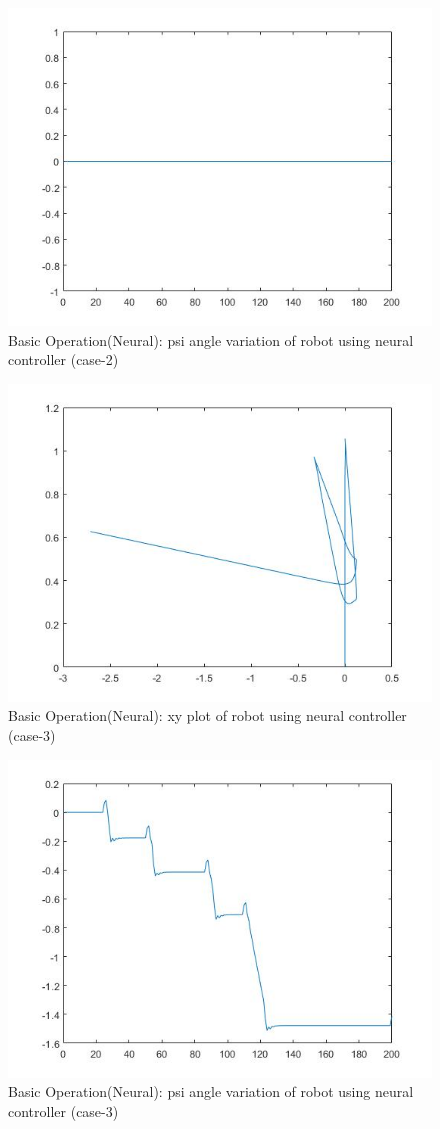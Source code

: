 \documentclass{l4proj}
\begin{document}
\begin{figure}[htb]
    \centering
    \includegraphics[width=0.5\linewidth]{images/Neuraltest2fig4.jpg}

    \caption{Basic Operation(Neural): psi angle variation of robot using neural controller (case-2)}
    \label{fig:Model1sim4} 
\end{figure}
\begin{figure}[htb]
    \centering
    \includegraphics[width=0.5\linewidth]{images/Neuraltest3fig2.jpg}

    \caption{Basic Operation(Neural): xy plot of robot using neural controller (case-3)}
    \label{fig:Model1sim4} 
\end{figure}
\begin{figure}[htb]
    \centering
    \includegraphics[width=0.5\linewidth]{images/Neuraltest3fig4.jpg}

    \caption{Basic Operation(Neural): psi angle variation of robot using neural controller (case-3)}
    \label{fig:Model1sim4} 
\end{figure}
\end{document}
